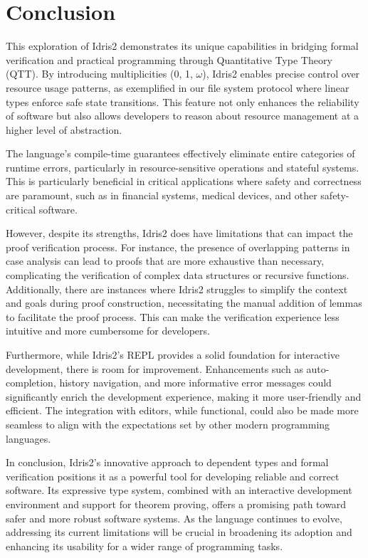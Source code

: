 \documentclass[]{rptuseminar}
\begin{document}
\section{Conclusion}  
\label{sec:conclusion}  

This exploration of Idris2 demonstrates its unique capabilities in bridging formal verification and practical programming through Quantitative Type Theory (QTT). By introducing multiplicities (0, 1, \(\omega\)), Idris2 enables precise control over resource usage patterns, as exemplified in our file system protocol where linear types enforce safe state transitions. This feature not only enhances the reliability of software but also allows developers to reason about resource management at a higher level of abstraction.

The language's compile-time guarantees effectively eliminate entire categories of runtime errors, particularly in resource-sensitive operations and stateful systems. This is particularly beneficial in critical applications where safety and correctness are paramount, such as in financial systems, medical devices, and other safety-critical software.

However, despite its strengths, Idris2 does have limitations that can impact the proof verification process. For instance, the presence of overlapping patterns in case analysis can lead to proofs that are more exhaustive than necessary, complicating the verification of complex data structures or recursive functions. Additionally, there are instances where Idris2 struggles to simplify the context and goals during proof construction, necessitating the manual addition of lemmas to facilitate the proof process. This can make the verification experience less intuitive and more cumbersome for developers.

Furthermore, while Idris2's REPL provides a solid foundation for interactive development, there is room for improvement. Enhancements such as auto-completion, history navigation, and more informative error messages could significantly enrich the development experience, making it more user-friendly and efficient. The integration with editors, while functional, could also be made more seamless to align with the expectations set by other modern programming languages.

In conclusion, Idris2's innovative approach to dependent types and formal verification positions it as a powerful tool for developing reliable and correct software. Its expressive type system, combined with an interactive development environment and support for theorem proving, offers a promising path toward safer and more robust software systems. As the language continues to evolve, addressing its current limitations will be crucial in broadening its adoption and enhancing its usability for a wider range of programming tasks.
\end{document}
